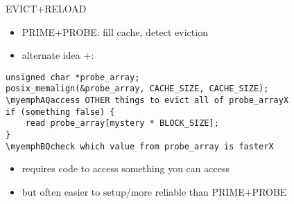 \providecommand{\myemphA}[1]{\myemph<2>{#1}}
\providecommand{\myemphB}[1]{\myemph<3>{#1}}

\begin{frame}[fragile]{EVICT+RELOAD}
    \begin{itemize}
    \item PRIME+PROBE: fill cache, detect eviction
    \item alternate idea +:
    \end{itemize}
\begin{Verbatim}[fontsize=\small,commandchars=\\QX]
unsigned char *probe_array;
posix_memalign(&probe_array, CACHE_SIZE, CACHE_SIZE);
\myemphAQaccess OTHER things to evict all of probe_arrayX
if (something false) {
    read probe_array[mystery * BLOCK_SIZE];
}
\myemphBQcheck which value from probe_array is fasterX
\end{Verbatim}
\begin{itemize}
\item requires code to access something you can access
\item but often easier to setup/more reliable than PRIME+PROBE
\end{itemize}
\end{frame}
